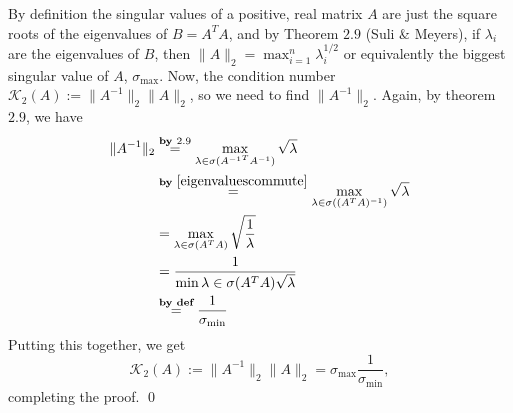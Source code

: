 By definition the singular values of a positive, real matrix $A$ are just the square roots of the eigenvalues of $B = A^TA$, and by Theorem $2.9$ (Suli \& Meyers), if $\lambda_i$ are the eigenvalues of $B$, then $\|A\|_2 = \max_{i=1}^n\lambda_i^{1/2}$ or equivalently the biggest singular value of $A$, $\sigma_{\max}$. Now, the condition number $\mathcal{K}_2(A):=\|A^{-1}\|_2\|A\|_2$, so we need to find $\|A^{-1}\|_2$.
Again, by theorem $2.9$, we have
  \begin{align*}
    \|A^{-1}\| _2 & \stackrel{\textbf{by }2.9}{=} \max_{ \lambda\in\sigma({A^{-1}}^{T} A^{-1} ) } \sqrt{\lambda} \\
    & \stackrel{\textbf{by }\ref{eigenvaluescommute}}{=} \max_{ \lambda\in\sigma((A^TA)^{-1}) } \sqrt{\lambda} \\
    & = \max_{ \lambda\in\sigma(A^TA)} \sqrt{\frac{1}{\lambda}} \\
    & = \frac{1}{\min{\lambda\in\sigma(A^TA)}\sqrt{\lambda}} \\
    & \stackrel{\textbf{by def}}{=} \frac{1}{\sigma_{\min}}
  \end{align*}
Putting this together, we get
  $$ \mathcal{K}_2(A):=\|A^{-1}\|_2\|A\|_2 = \sigma_{\max}\frac{1}{\sigma_{\min}}, $$
completing the proof.
\qed

